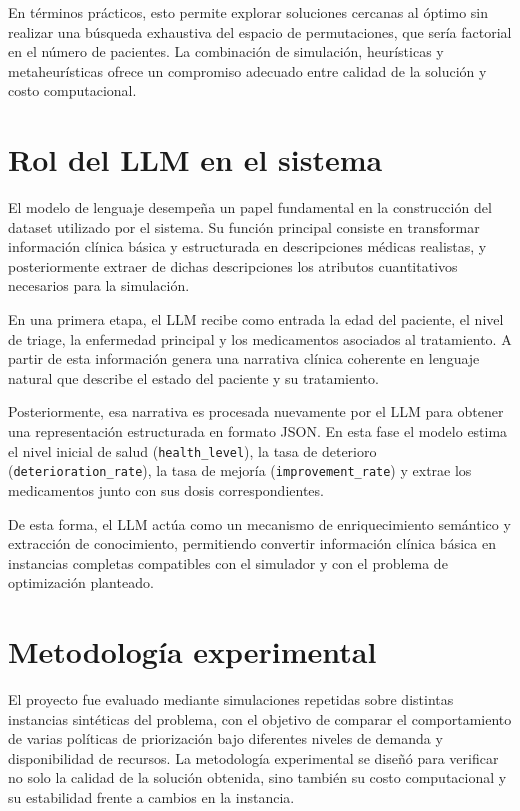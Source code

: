 \documentclass[12pt,a4paper]{article}
\begin{document}
En términos prácticos, esto permite explorar soluciones cercanas al óptimo sin realizar una búsqueda exhaustiva del 
espacio de permutaciones, que sería factorial en el número de pacientes. La combinación de simulación, heurísticas y 
metaheurísticas ofrece un compromiso adecuado entre calidad de la solución y costo computacional.

\section{Rol del LLM en el sistema}

El modelo de lenguaje desempeña un papel fundamental en la construcción del dataset utilizado por el sistema. 
Su función principal consiste en transformar información clínica básica y estructurada en descripciones médicas realistas, 
y posteriormente extraer de dichas descripciones los atributos cuantitativos necesarios para la simulación.

En una primera etapa, el LLM recibe como entrada la edad del paciente, el nivel de triage, la enfermedad principal y 
los medicamentos asociados al tratamiento. 
A partir de esta información genera una narrativa clínica coherente en lenguaje natural que describe el estado del paciente y 
su tratamiento.

Posteriormente, esa narrativa es procesada nuevamente por el LLM para obtener una representación estructurada en formato JSON. 
En esta fase el modelo estima el nivel inicial de salud (\texttt{health\_level}), 
la tasa de deterioro (\texttt{deterioration\_rate}), la tasa de mejoría (\texttt{improvement\_rate}) y 
extrae los medicamentos junto con sus dosis correspondientes.

De esta forma, el LLM actúa como un mecanismo de enriquecimiento semántico y extracción de conocimiento, 
permitiendo convertir información clínica básica en instancias completas compatibles con el simulador y 
con el problema de optimización planteado.

\section{Metodología experimental}

El proyecto fue evaluado mediante simulaciones repetidas sobre distintas instancias sintéticas del problema, 
con el objetivo de comparar el comportamiento de varias políticas de priorización bajo diferentes niveles de demanda y 
disponibilidad de recursos. 
La metodología experimental se diseñó para verificar no solo la calidad de la solución obtenida, 
sino también su costo computacional y su estabilidad frente a cambios en la instancia.
\end{document}
